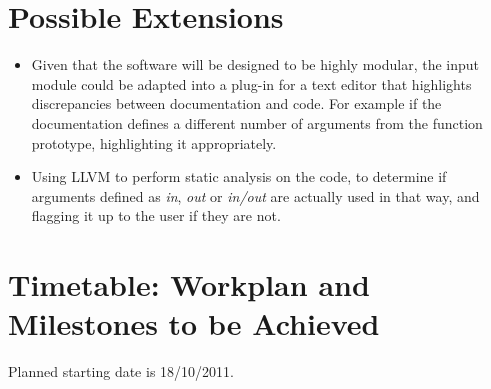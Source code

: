 \section{Possible Extensions}

\begin{itemize}
\item Given that the software will be designed to be highly modular,
  the input module could be adapted into a plug-in for a text editor
  that highlights discrepancies between documentation and code. For
  example if the documentation defines a different number of arguments
  from the function prototype, highlighting it appropriately.
\item Using LLVM to perform static analysis on the code, to determine
  if arguments defined as \emph{in}, \emph{out} or \emph{in/out} are actually used in that
  way, and flagging it up to the user if they are not.
\end{itemize}

\section{Timetable: Workplan and Milestones to be Achieved}

Planned starting date is 18/10/2011.

